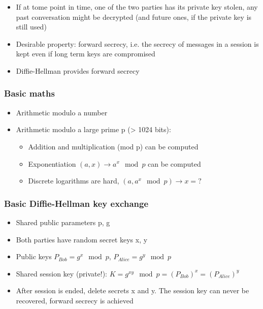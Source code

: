 \documentclass{article}
\newenvironment{myitemize}
{ \begin{itemize}
    \setlength{\itemsep}{005pt}
    \setlength{\parskip}{0pt}
    \setlength{\parsep}{0pt}     }
{ \end{itemize}                  }
\begin{document}
\begin{multicols}{2}
\begin{myitemize}
    \item If at tome point in time, one of the two parties has its private key stolen, any past conversation might be decrypted (and future ones, if the private key is still used)
    \item Desirable property: forward secrecy, i.e. the secrecy of messages in a session is kept even if long term keys are compromised 
    \item Diffie-Hellman provides forward secrecy
\end{myitemize}

\subsubsection{Basic maths}

\begin{myitemize}
    \item Arithmetic modulo a number
    \item Arithmetic modulo a large prime p (> 1024 bits):
    \begin{myitemize}
        \item Addition and multiplication (mod p) can be computed
        \item Exponentiation $(a,x)\rightarrow a^x \mod p$ can be computed
        \item Discrete logarithms are hard, $(a, a^x\mod p) \rightarrow x=?$
    \end{myitemize}
\end{myitemize}

\subsubsection{Basic Diffie-Hellman key exchange}

\begin{myitemize}
    \item Shared public parameters p, g
    \item Both parties have random secret keys x, y
    \item Public keys $P_{Bob}=g^x \mod p$, $P_{Alice}=g^y\mod p$
    \item Shared session key (private!): $K=g^{xy}\mod p = (P_{Bob})^x = (P_{Alice})^y$
    \item After session is ended, delete secrets x and y. The session key can never be recovered, forward secrecy is achieved
\end{myitemize}



\end{multicols}
\end{document}
